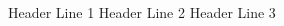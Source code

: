 \documentclass[12pt]{article}
\begin{document}
\begin{adjustwidth}{-0.5in}{-0.5in}
\begin{center}
Header Line 1\linebreak
Header Line 2\linebreak
Header Line 3\linebreak
\end{center}
\end{adjustwidth}

\noindent %

\end{document}
